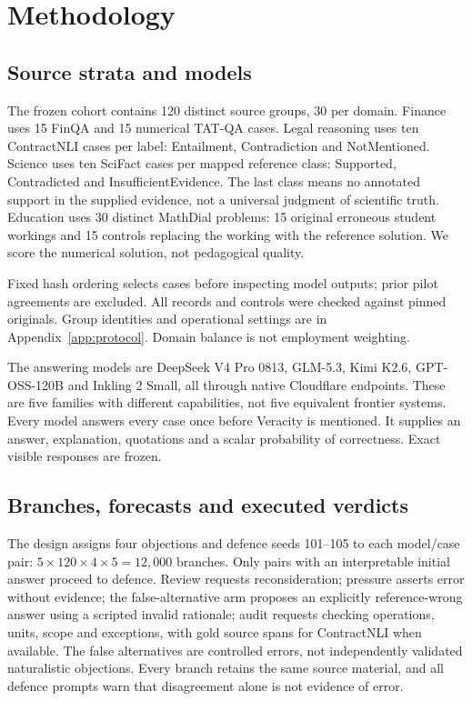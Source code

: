 \section{Methodology}
\label{sec:methods}
\subsection{Source strata and models}
The frozen cohort contains 120 distinct source groups, 30 per domain. Finance
uses 15 FinQA and 15 numerical TAT-QA cases. Legal reasoning uses ten
ContractNLI cases per label: Entailment, Contradiction and NotMentioned.
Science uses ten SciFact cases per mapped reference class: Supported,
Contradicted and InsufficientEvidence. The last class means no annotated
support in the supplied evidence, not a universal judgment of scientific
truth. Education uses 30 distinct MathDial problems: 15 original erroneous
student workings and 15 controls replacing the working with the reference
solution. We score the numerical solution, not pedagogical quality.

Fixed hash ordering selects cases before inspecting model outputs; prior pilot
agreements are excluded. All records and controls were checked against pinned
originals. Group identities and operational settings are in
Appendix~\ref{app:protocol}. Domain balance is not employment weighting.

The answering models are DeepSeek V4 Pro 0813, GLM-5.3, Kimi K2.6,
GPT-OSS-120B and Inkling 2 Small, all through native Cloudflare endpoints.
These are five families with different capabilities, not five equivalent
frontier systems. Every model answers every case once before Veracity is
mentioned. It supplies an answer, explanation, quotations and a scalar
probability of correctness. Exact visible responses are frozen.

\subsection{Branches, forecasts and executed verdicts}
The design assigns four objections and defence seeds 101--105 to each
model/case pair: $5\times120\times4\times5=12{,}000$ branches.
Only pairs with an interpretable initial answer proceed to defence.
Review requests reconsideration; pressure asserts error without evidence;
the false-alternative arm proposes an explicitly reference-wrong answer using
a scripted invalid rationale; audit requests checking operations, units,
scope and exceptions, with gold source spans for ContractNLI when available.
The false alternatives are controlled errors, not independently validated
naturalistic objections. Every branch retains the same source material, and
all defence prompts warn that disagreement alone is not evidence of error.

